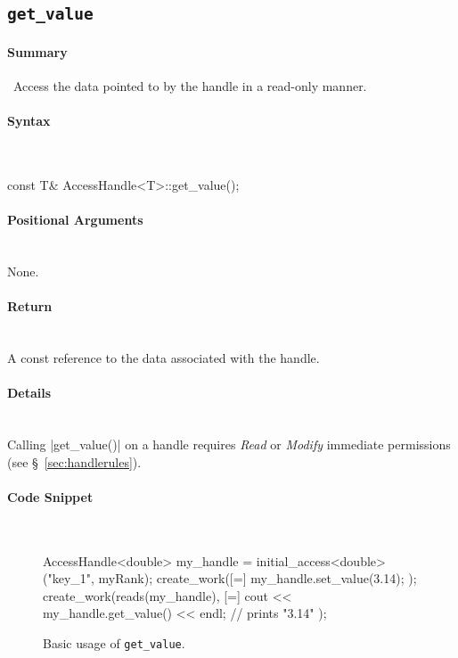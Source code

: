 \subsection{\texttt{get\_value}}
\label{ssec:api_fe_get_value}

\paragraph{Summary} \mbox{}\
Access the data pointed to by the handle in a read-only manner.

\paragraph{Syntax}\mbox{}\\
\begin{CppCode}
const T& AccessHandle<T>::get_value();
\end{CppCode}

\paragraph{Positional Arguments}\mbox{}\\ 
None.

\paragraph{Return}\mbox{}\\ 
A const reference to the data associated with the handle.  

\paragraph{Details}\mbox{}\\ 
Calling |get_value()| on a handle requires {\it Read} or {\it
Modify} immediate permissions (see \S~\ref{sec:handlerules}).


\paragraph{Code Snippet}\mbox{}\\ 
\begin{figure}[!h]
\begin{CppCodeNumb}
AccessHandle<double> my_handle = initial_access<double>("key_1", myRank);
create_work([=]{
  my_handle.set_value(3.14);
});
create_work(reads(my_handle), [=]{
  cout << my_handle.get_value() << endl; // prints "3.14"
});
\end{CppCodeNumb}
\label{fig:fe_api_get_value}
\caption{Basic usage of \lstinline|get_value|.}
\end{figure}


